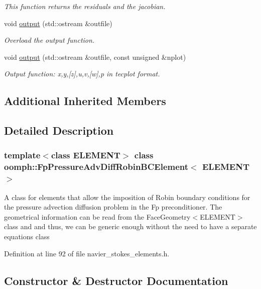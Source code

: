 \begin{DoxyCompactItemize}
\begin{DoxyCompactList}\small\item\em This function returns the residuals and the jacobian. \end{DoxyCompactList}\item 
void \hyperlink{classoomph_1_1FpPressureAdvDiffRobinBCElement_a64be3ee4d96836005509bc7b5ce7f098}{output} (std\+::ostream \&outfile)
\begin{DoxyCompactList}\small\item\em Overload the output function. \end{DoxyCompactList}\item 
void \hyperlink{classoomph_1_1FpPressureAdvDiffRobinBCElement_ab4045d7aced2c411f2c3026037674f54}{output} (std\+::ostream \&outfile, const unsigned \&nplot)
\begin{DoxyCompactList}\small\item\em Output function\+: x,y,\mbox{[}z\mbox{]},u,v,\mbox{[}w\mbox{]},p in tecplot format. \end{DoxyCompactList}\end{DoxyCompactItemize}
\subsection*{Additional Inherited Members}


\subsection{Detailed Description}
\subsubsection*{template$<$class E\+L\+E\+M\+E\+NT$>$\newline
class oomph\+::\+Fp\+Pressure\+Adv\+Diff\+Robin\+B\+C\+Element$<$ E\+L\+E\+M\+E\+N\+T $>$}

A class for elements that allow the imposition of Robin boundary conditions for the pressure advection diffusion problem in the Fp preconditioner. The geometrical information can be read from the Face\+Geometry$<$\+E\+L\+E\+M\+E\+N\+T$>$ class and and thus, we can be generic enough without the need to have a separate equations class 

Definition at line 92 of file navier\+\_\+stokes\+\_\+elements.\+h.



\subsection{Constructor \& Destructor Documentation}
\mbox{\label{classoomph_1_1FpPressureAdvDiffRobinBCElement_a9a21514d6237032042035c70fc14fd7a}} 

